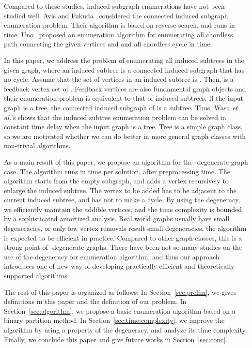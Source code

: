 \documentclass{llncs}
\begin{document}
Compared to these studies, 
induced subgraph enumerations have not been studied well.
Avis and Fukuda~\cite{Avis:Fukuda:DAM:1996} considered 
the connected induced subgraph enumeration problem. 
Their algorithm is based on reverse search, 
and runs in  time.
Uno~\cite{Uno:SIGAL:2003} proposed 
an enumeration algorithm for enumerating all chordless path 
connecting the given vertices  and  
and all chordless cycle in  time. 

In this paper, 
we address the problem of enumerating all induced subtrees
in the given graph, 
where an induced subtree is a connected induced subgraph that has no cycle. 
Assume that the set of vertices in an induced subtree is . 
Then,  is a feedback vertex set of . 
Feedback vertices are also 
fundamental graph objects and their enumeration problem is 
equivalent to that of induced subtrees. 
If the input graph  is a tree, 
the connected induced subgraph of  is a subtree. 
Thus, 
Wasa \textit{et al.}'s shows that 
the induced subtree enumeration problem can be solved in constant time delay 
when the input graph is a tree. 
Tree is a simple graph class, 
so we are motivated whether we can do better
in more general graph classes with non-trivial algorithms.


As a main result of this paper, 
we propose an algorithm for the -degenerate graph case. 
The algorithm runs in  time per solution, 
after  preprocessing time. 
The algorithm starts from the empty subgraph,
and adds a vertex recursively to enlarge the induced subtree.
The vertex to be added has to be adjacent to the current induced subtree, 
and has not to make a cycle. 
By using the degeneracy, 
we efficiently maintain the addible vertices, 
and the time complexity is bounded by a sophisticated amortized analysis.
Real world graphs usually have small degeneracies, 
or only few vertex removals result small degeneracies, 
the algorithm is expected to be efficient in practice. 
Compared to other graph classes, 
this is a strong point of -degenerate graphs. 
There have been not so many studies on the use of the degeneracy for enumeration algorithm, 
and thus our approach introduces 
one of new way of developing practically efficient 
and theoretically supported algorithms.


The rest of this paper is organized as follows: 
In Section~\ref{sec:prelim}, 
we gives definitions in this paper 
and the definition of our problem. 
In Section~\ref{sec:algorithm}, 
we propose a basic enumeration algorithm based on a binary partition method. 
In Section~\ref{sec:time:complexity}, 
we improve the algorithm by using a property of the degeneracy, 
and analyze its time complexity. 
Finally, we conclude this paper and give future works in Section~\ref{sec:conc}. 
\end{document}
